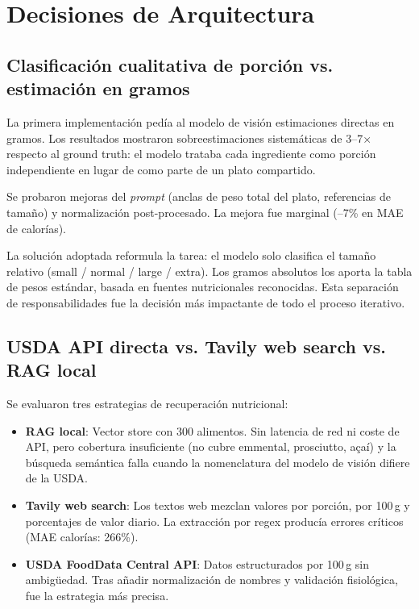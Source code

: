 \documentclass[10pt,a4paper]{article}
\begin{document}
\section{Decisiones de Arquitectura}

\subsection{Clasificación cualitativa de porción vs. estimación en gramos}

La primera implementación pedía al modelo de visión estimaciones directas en gramos. Los
resultados mostraron sobreestimaciones sistemáticas de 3–7× respecto al ground truth: el modelo
trataba cada ingrediente como porción independiente en lugar de como parte de un plato compartido.

Se probaron mejoras del \textit{prompt} (anclas de peso total del plato, referencias de tamaño) y
normalización post-procesado. La mejora fue marginal (--7\% en MAE de calorías).

La solución adoptada reformula la tarea: el modelo solo clasifica el tamaño relativo (small /
normal / large / extra). Los gramos absolutos los aporta la tabla de pesos estándar, basada en
fuentes nutricionales reconocidas. Esta separación de responsabilidades fue la decisión más
impactante de todo el proceso iterativo.

\subsection{USDA API directa vs. Tavily web search vs. RAG local}

Se evaluaron tres estrategias de recuperación nutricional:

\begin{itemize}[noitemsep, topsep=2pt]
  \item \textbf{RAG local}: Vector store con 300 alimentos. Sin latencia de red ni coste de API, pero
        cobertura insuficiente (no cubre emmental, prosciutto, açaí) y la búsqueda semántica falla
        cuando la nomenclatura del modelo de visión difiere de la USDA.
  \item \textbf{Tavily web search}: Los textos web mezclan valores por porción, por 100\,g y
        porcentajes de valor diario. La extracción por regex producía errores críticos (MAE calorías:
        266\%).
  \item \textbf{USDA FoodData Central API}: Datos estructurados por 100\,g sin ambigüedad. Tras
        añadir normalización de nombres y validación fisiológica, fue la estrategia más precisa.
\end{itemize}
\end{document}
